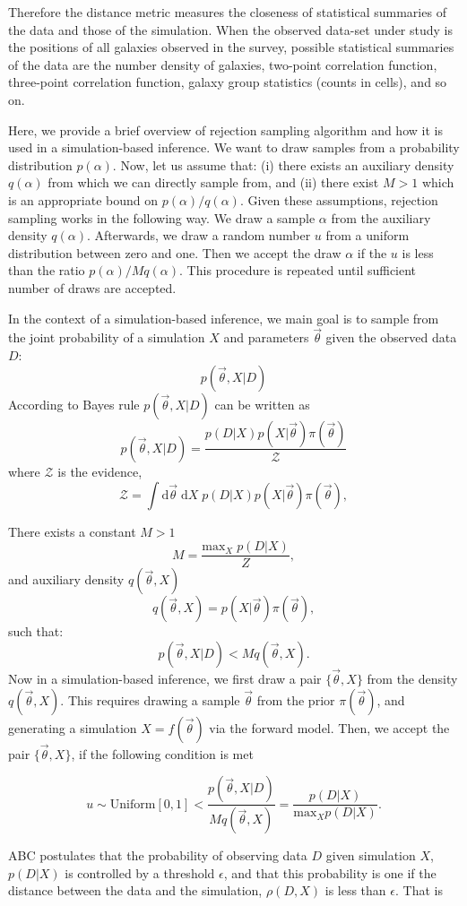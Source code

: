 \documentclass[12pt, preprint]{aastex}
\newcommand{\beq}{\begin{equation}}
\newcommand{\eeq}{\end{equation}}
\newcommand{\pars}{\vec{\theta}}
\newcommand{\dev}{\mathrm{d}}
\begin{document}
Therefore the distance metric measures the closeness of statistical summaries of the data and those of the simulation. When the observed data-set under study is the positions of all galaxies observed in the survey, possible statistical summaries of the data are the number density of galaxies, two-point correlation function, three-point correlation function, galaxy group statistics (counts in cells), and so on.

Here, we provide a brief overview of rejection sampling algorithm and how it is used in a simulation-based inference. We want to draw samples from a probability distribution $p(\alpha)$. Now, let us assume that: (i) there exists an auxiliary density $q(\alpha)$ from which we can directly sample from, and (ii) there exist $M>1$ which is an appropriate bound on $p(\alpha)/q(\alpha)$. Given these assumptions, rejection sampling works in the following way. We draw a sample $\alpha$ from the auxiliary density $q(\alpha)$. Afterwards, we draw a random number $u$ from a uniform distribution between zero and one. Then we accept the draw $\alpha$ if the $u$ is less than the ratio $p(\alpha)/Mq(\alpha)$. This procedure is repeated until sufficient number of draws are accepted.

In the context of a simulation-based inference, we main goal is to 
sample from the joint probability of a simulation $X$ and parameters 
$\pars$ given the observed data $D$: 
\beq
p(\pars,X | D)
\eeq
According to Bayes rule $p(\pars, X | D)$ can be written as 
\beq
p(\pars,X | D)  = \frac{p(D|X)p(X|\pars)\pi(\pars)}{\mathcal{Z}}
\eeq
where $\mathcal{Z}$  is the evidence, 
\beq
\mathcal{Z} = \int \dev \pars \; \dev X \; p(D|X)p(X|\pars)\pi(\pars),
\eeq

There exists a constant $M>1$ 
\beq 
M = \frac{\mathrm{max}_{X} \; p(D|X)}{Z},
\eeq 
and auxiliary density $q(\pars ,X)$
\beq 
q(\pars ,X)=p(X|\pars )\pi(\pars ),
\eeq 
such that:
\beq 
p(\pars ,X|D)<Mq(\pars ,X).
\eeq 
Now in a simulation-based inference, we first draw a pair $\{\pars , X \}$ from the density $q(\pars , X)$. This requires drawing a sample $\pars$ from the prior $\pi(\pars)$, and generating a simulation $X=f(\pars)$ via the forward model. Then, we accept the pair $\{\pars , X \}$, if the following condition is met

\beq 
u \sim \mathrm{Uniform}[0,1] < \frac{p(\pars,X|D)}{Mq(\pars,X)}=\frac{p(D|X)}{\mathrm{max}_{X}p(D|X)}.
\eeq 

ABC postulates that the probability of observing data $D$ given simulation $X$, $p(D|X)$ is controlled by a threshold $\epsilon$, and that this probability is one if the distance between the data and the simulation, $\rho(D,X)$ is less than $\epsilon$. That is
\end{document}
